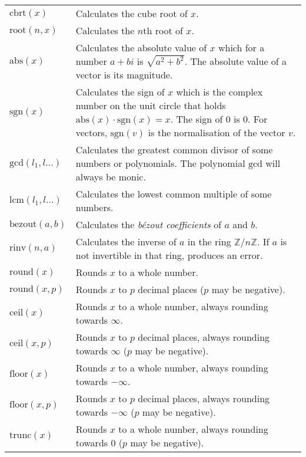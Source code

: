 \documentclass[10pt]{article}
\newcommand{\tabgap}{\vspace{3mm}\\}
\begin{document}
\begin{longtable}{p{}p{}}
        $ \mathrm{cbrt}(x) $                       & Calculates the cube root of $ x $. \\
        $ \mathrm{root}(n, x) $                    & Calculates the $ n $th root of $ x $. \tabgap
        $ \mathrm{abs}(x) $                        & Calculates the absolute value of $ x $ which for a number $ a + bi$ is $ \sqrt{a^2 + b^2} $. The absolute value of a vector is its magnitude. \\
        $ \mathrm{sgn}(x) $                        & Calculates the sign of $ x $ which is the complex number on the unit circle that holds $ \mathrm{abs}(x) \cdot \mathrm{sgn}(x) = x $. The sign of $ 0 $ is $ 0 $. For vectors, $ \mathrm{sgn}(v) $ is the normalisation of the vector $ v $. \tabgap
        $ \mathrm{gcd}(l_1, l\dots) $              & Calculates the greatest common divisor of some numbers or polynomials. The polynomial $ \mathrm{gcd} $ will always be monic. \\
        $ \mathrm{lcm}(l_1, l\dots) $              & Calculates the lowest common multiple of some numbers. \tabgap
        $ \mathrm{bezout}(a, b) $                  & Calculates the \textsl{b\'ezout coefficients} of $ a $ and $ b $. \\
        $ \mathrm{rinv}(n, a) $                    & Calculates the inverse of $ a $ in the ring $ \mathbb{Z} / n\mathbb{Z} $. If $ a $ is not invertible in that ring, produces an error. \\
        $ \mathrm{round}(x) $                      & Rounds $ x $ to a whole number. \\
        $ \mathrm{round}(x, p) $                   & Rounds $ x $ to $ p $ decimal places ($ p $ may be negative). \\
        $ \mathrm{ceil}(x) $                       & Rounds $ x $ to a whole number, always rounding towards $ \infty $. \\
        $ \mathrm{ceil}(x, p) $                    & Rounds $ x $ to $ p $ decimal places, always rounding towards $ \infty $ ($ p $ may be negative). \\
        $ \mathrm{floor}(x) $                      & Rounds $ x $ to a whole number, always rounding towards $ -\infty $. \\
        $ \mathrm{floor}(x, p) $                   & Rounds $ x $ to $ p $ decimal places, always rounding towards $ -\infty $ ($ p $ may be negative). \\
        $ \mathrm{trunc}(x) $                      & Rounds $ x $ to a whole number, always rounding towards $ 0 $ ($ p $ may be negative). \\

\end{longtable}
\end{document}
